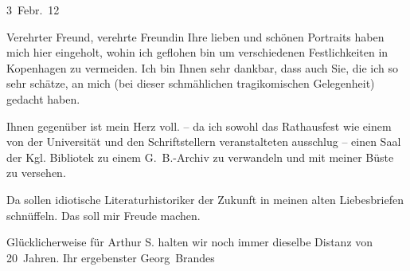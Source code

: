 \pstart
           \raggedleft{}3 Febr. 12\pend
           \pend
           
\pstart{}Verehrter Freund, verehrte Freundin\pend\vspace{0.5em}
\pstart
           Ihre lieben und schönen Portraits haben mich hier eingeholt, wohin ich geflohen bin
               um verschiedenen Festlichkeiten in Kopenhagen
               zu vermeiden. Ich bin Ihnen sehr dankbar, dass auch Sie, die ich so sehr schätze, an
               mich (bei dieser schmählichen tragikomischen Gelegenheit) gedacht haben.\pend
           
\pstart
           Ihnen gegenüber ist mein Herz voll. \label{K_L02051-1v}\label{K_L02051-1} – da ich sowohl das Rathausfest wie einem von
               der Universität und den Schriftstellern veranstalteten ausschlug – einen Saal der Kgl. Bibliotek zu einem G. B.-Archiv zu verwandeln und mit meiner Büste zu versehen.\pend
           
\pstart
           Da sollen idiotische Literaturhistoriker der Zukunft in meinen alten Liebesbriefen
               schnüffeln. Das soll mir Freude machen.\pend
           
\pstart
           Glücklicherweise für Arthur S. halten wir noch immer dieselbe Distanz von
               20 Jahren.\pend
           \pstart Ihr ergebenster \spacefill\mbox{Georg Brandes}\pend{}\endnumbering{}  \newcommand{\dateiname}{L02051}\newcommand{\titel}{Georg Brandes an Arthur und Olga Schnitzler, 3. 2. 1912}\newcommand{\editorInnen}{Martin Anton Müller und Gerd-Hermann Susen}
